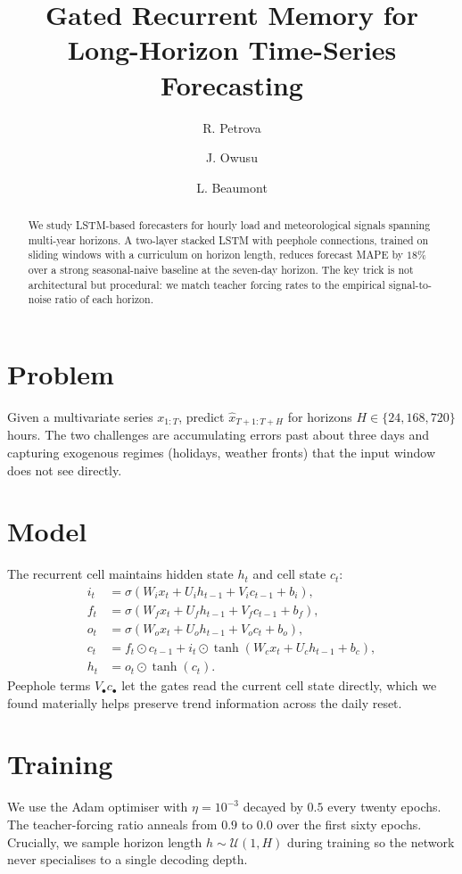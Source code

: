 \documentclass[11pt]{article}
\title{Gated Recurrent Memory for Long-Horizon Time-Series Forecasting}
\author{R. Petrova \and J. Owusu \and L. Beaumont}
\date{}
\begin{document}
\maketitle

\begin{abstract}
We study LSTM-based forecasters for hourly load and meteorological signals
spanning multi-year horizons. A two-layer stacked LSTM with peephole
connections, trained on sliding windows with a curriculum on horizon length,
reduces forecast MAPE by $18\%$ over a strong seasonal-naive baseline at the
seven-day horizon. The key trick is not architectural but procedural: we
match teacher forcing rates to the empirical signal-to-noise ratio of each
horizon.
\end{abstract}

\section{Problem}
Given a multivariate series $x_{1:T}$, predict $\hat{x}_{T+1:T+H}$ for
horizons $H \in \{24, 168, 720\}$ hours. The two challenges are accumulating
errors past about three days and capturing exogenous regimes (holidays,
weather fronts) that the input window does not see directly.

\section{Model}
The recurrent cell maintains hidden state $h_t$ and cell state $c_t$:
\begin{align}
i_t &= \sigma(W_i x_t + U_i h_{t-1} + V_i c_{t-1} + b_i), \\
f_t &= \sigma(W_f x_t + U_f h_{t-1} + V_f c_{t-1} + b_f), \\
o_t &= \sigma(W_o x_t + U_o h_{t-1} + V_o c_t + b_o), \\
c_t &= f_t \odot c_{t-1} + i_t \odot \tanh(W_c x_t + U_c h_{t-1} + b_c), \\
h_t &= o_t \odot \tanh(c_t).
\end{align}
Peephole terms $V_\bullet c_\bullet$ let the gates read the current cell state
directly, which we found materially helps preserve trend information across
the daily reset.

\section{Training}
We use the Adam optimiser with $\eta = 10^{-3}$ decayed by $0.5$ every twenty
epochs. The teacher-forcing ratio anneals from $0.9$ to $0.0$ over the first
sixty epochs. Crucially, we sample horizon length $h \sim \mathcal{U}(1, H)$
during training so the network never specialises to a single decoding depth.
\end{document}
